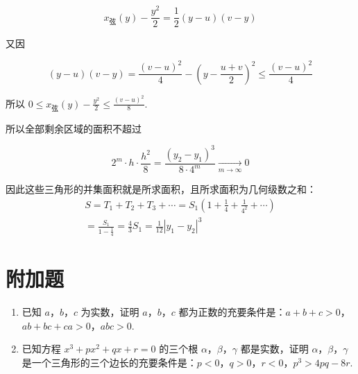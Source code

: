 \begin{solution}
\begin{enumerate}
\[
x_{\text{弦}}(y)-\frac{y^2}{2}=\frac12(y-u)(v-y)
\]

又因

\[
(y-u)(v-y)=\frac{(v-u)^2}{4}-\left(y-\frac{u+v}{2}\right)^2\leq\frac{(v-u)^2}{4}
\]

所以 \(0\leq x_{\text{弦}}(y)-\frac{y^2}{2}\leq\frac{(v-u)^2}{8}\).

所以全部剩余区域的面积不超过

\[
2^m\cdot h\cdot\frac{h^2}{8}=\frac{(y_2-y_1)^3}{8\cdot4^m}\xrightarrow[m\to\infty]{}0
\]

因此这些三角形的并集面积就是所求面积，且所求面积为几何级数之和：
\[
\begin{gathered}
S=T_1+T_2+T_3+\cdots=S_1\left(1+\frac14+\frac1{4^2}+\cdots\right)\\
=\frac{S_1}{1-\frac14}=\frac43S_1=\frac1{12}|y_1-y_2|^3
\end{gathered}
\]
\end{enumerate}
\end{solution}

\section{附加题}

\begin{problem}
\begin{enumerate}
\item 已知 \(a\)，\(b\)，\(c\) 为实数，证明 \(a\)，\(b\)，\(c\) 都为正数的充要条件是：\(a+b+c>0\)，\(ab+bc+ca>0\)，\(abc>0\).
\item 已知方程 \(x^3+px^2+qx+r=0\) 的三个根 \(\alpha\)，\(\beta\)，\(\gamma\) 都是实数，证明 \(\alpha\)，\(\beta\)，\(\gamma\) 是一个三角形的三个边长的充要条件是：\(p<0\)，\(q>0\)，\(r<0\)，\(p^3>4pq-8r\).
\end{enumerate}
\end{problem}

